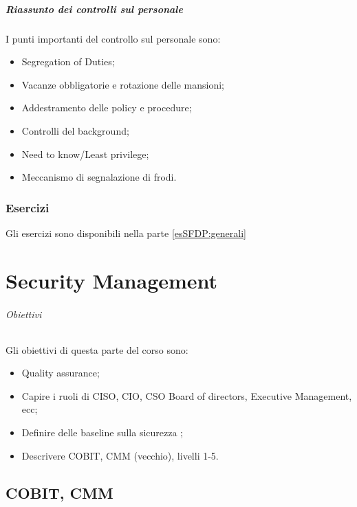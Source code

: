 \subsubsection{Riassunto dei controlli sul personale}

I punti importanti del controllo sul personale sono:
\begin{itemize}
\item Segregation of Duties;
\item Vacanze obbligatorie e rotazione delle mansioni;
\item Addestramento delle policy e procedure;
\item Controlli del background;
\item Need to know/Least privilege;
\item Meccanismo di segnalazione di frodi.
\end{itemize}

\section{Esercizi}

Gli esercizi sono disponibili nella parte \ref{esSFDP:generali}

\part{Security Management}
\label{SM}

\paragraph{Obiettivi}

Gli obiettivi di questa parte del corso sono:
\begin{itemize}
\item Quality assurance;
\item Capire i ruoli di CISO, CIO, CSO Board of directors, Executive
Management, ecc;
\item Definire delle baseline sulla sicurezza ;
\item Descrivere COBIT, CMM (vecchio), livelli 1-5.
\end{itemize}

\chapter{COBIT, CMM}


